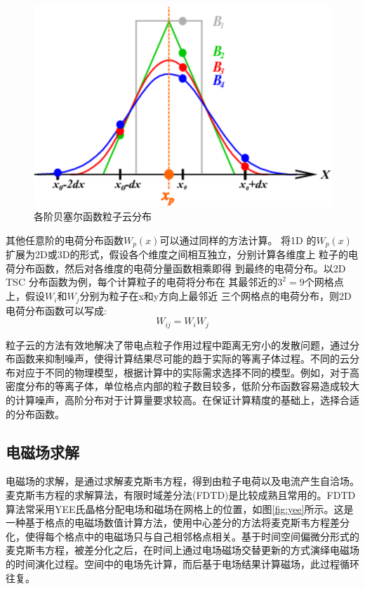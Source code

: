 \begin{figure}[!htbp]
  \centering
  \includegraphics[width=\MyFactor\textwidth]{Img/particlecloud.eps}
  \caption{各阶贝塞尔函数粒子云分布}
  \label{fig:particlecloud}
\end{figure}
其他任意阶的电荷分布函数$W_p(x)$可以通过同样的方法计算。
将1D 的$W_p(x)$扩展为2D或3D的形式，假设各个维度之间相互独立，分别计算各维度上
粒子的电荷分布函数，然后对各维度的电荷分量函数相乘即得
到最终的电荷分布。以2D TSC 分布函数为例，每个计算粒子的电荷将分布在
其最邻近的$3^2=9$个网格点上，假设$W_i$和$W_j$分别为粒子在x和y方向上最邻近
三个网格点的电荷分布，则2D 电荷分布函数可以写成:
\begin{equation}
W_{ij}=W_{i}W_{j}
\end{equation}


粒子云的方法有效地解决了带电点粒子作用过程中距离无穷小的发散问题，通过分布函数来抑制噪声，使得计算结果尽可能的趋于实际的等离子体过程。不同的云分布对应于不同的物理模型，根据计算中的实际需求选择不同的模型。例如，对于高密度分布的等离子体，单位格点内部的粒子数目较多，低阶分布函数容易造成较大的计算噪声，高阶分布对于计算量要求较高。在保证计算精度的基础上，选择合适的分布函数。




\subsection{电磁场求解} 
电磁场的求解，是通过求解麦克斯韦方程，得到由粒子电荷以及电流产生自洽场。麦克斯韦方程的求解算法，有限时域差分法(FDTD)\cite{yee1966numerical,taflove1980application}是比较成熟且常用的。FDTD算法常采用YEE氏晶格\cite{yee1966numerical}分配电场和磁场在网格上的位置，如图\ref{fig:yee}所示。这是一种基于格点的电磁场数值计算方法，使用中心差分的方法将麦克斯韦方程差分化，使得每个格点中的电磁场只与自己相邻格点相关。基于时间空间偏微分形式的麦克斯韦方程，被差分化之后，在时间上通过电场磁场交替更新的方式演绎电磁场的时间演化过程。空间中的电场先计算，而后基于电场结果计算磁场，此过程循环往复。


